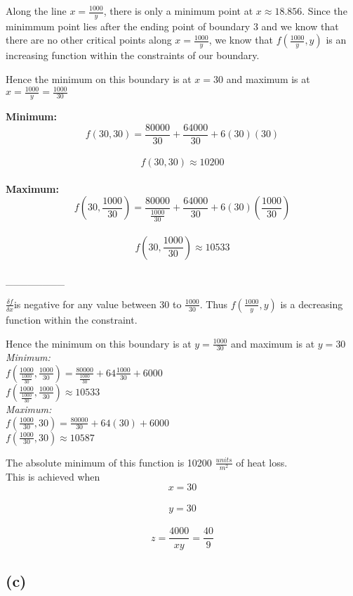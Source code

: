 \documentclass[11pt]{article}
\begin{document}
Along the line \(x = \frac{1000}{y}\), there is only a minimum point at
\(x \approx 18.856\). Since the minimmum point lies after the ending
point of boundary 3 and we know that there are no other critical points
along \(x = \frac{1000}{y}\), we know that \(f(\frac{1000}{y},y)\) is an
increasing function within the constraints of our boundary.

Hence the minimum on this boundary is at \(x=30\) and maximum is at
\(x=\frac {1000}{y} = \frac {1000}{30}\)

\textbf{Minimum:}\\
\[f(30,30) = \frac {80000}{30} + \frac {64000}{30} + 6(30)(30)\]\\
\[f(30,30) \approx 10200\]\\
\textbf{Maximum:}\\
\[f(30,\frac {1000}{30}) = \frac {80000}{\frac {1000}{30}} + \frac {64000}{30} + 6(30)(\frac {1000}{30})\]\\
\[f(30,\frac {1000}{30}) \approx 10533\]\\
\_\_\_\_\_\_\_\_

\(\frac{\delta f}{\delta x}\)is negative for any value between 30 to
\(\frac{1000}{30}\). Thus \(f(\frac{1000}{y},y)\) is a decreasing
function within the constraint.

Hence the minimum on this boundary is at \(y=\frac {1000}{30}\) and
maximum is at \(y=30\)\\
\emph{Minimum: }\\
\(f(\frac{1000}{\frac {1000}{30}},\frac {1000}{30}) = \frac {80000}{\frac {1000}{30}} + 64\frac {1000}{30} + 6000\)\\
\(f(\frac{1000}{\frac {1000}{30}},\frac {1000}{30}) \approx 10533\)\\
\emph{Maximum: }\\
\(f(\frac{1000}{30},30) = \frac {80000}{30} + 64(30) + 6000\)\\
\(f(\frac{1000}{30},30) \approx 10587\)

    The absolute minimum of this function is 10200 \(\frac {units}{m^2}\) of
heat loss.\\
This is achieved when\\
\[x = 30\]\\
\[y=30\]\\
\[z = \frac {4000}{xy} = \frac {40}{9}\]

    \subsection{(c)}\label{c}
\end{document}
